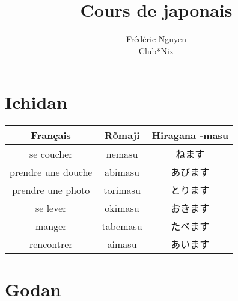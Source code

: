 \documentclass[11pt]{report}
\title{Cours de japonais}
\author{
	Frédéric Nguyen \\ Club*Nix
}
\newenvironment{Japanese}{%
\CJKfamily{min}%
\CJKtilde  
\CJKnospace}{}
\begin{document}
\maketitle
\tableofcontents

\chapter{Ichidan}

\begin{CJK}{UTF8}{}  
\begin{Japanese}
	\begin{center}
		\begin{tabular}{|c|c|c|}
				\hline
				\textbf{Français} & \textbf{Rõmaji} & \textbf{Hiragana -masu} \\
				\hline
				se coucher & nemasu & ねます \\	
				\hline 
				prendre une douche & abimasu & あびます \\
				\hline
				prendre une photo & torimasu & とります \\
				\hline
				se lever & okimasu & おきます \\
				\hline
				manger & tabemasu & たべます \\
				\hline
				rencontrer & aimasu & あいます \\
				\hline
			\end{tabular}
	\end{center}
\end{Japanese}  
\end{CJK}

\chapter{Godan}
\end{document}
